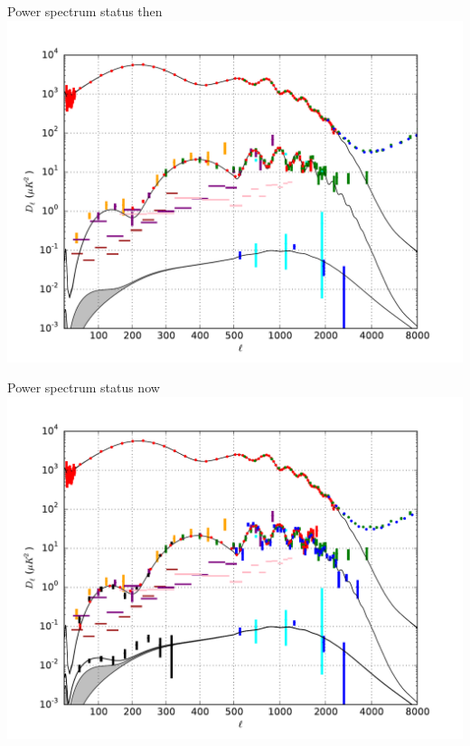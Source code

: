 \documentclass[table]{beamer}
\begin{document}
\begin{frame}{Power spectrum status then}
	\centering
	\includegraphics[width=\textwidth]{spectra_before.pdf}
\end{frame}

\begin{frame}{Power spectrum status now}
	\centering
	\includegraphics[width=\textwidth]{spectra_after.pdf}
\end{frame}
\end{document}
